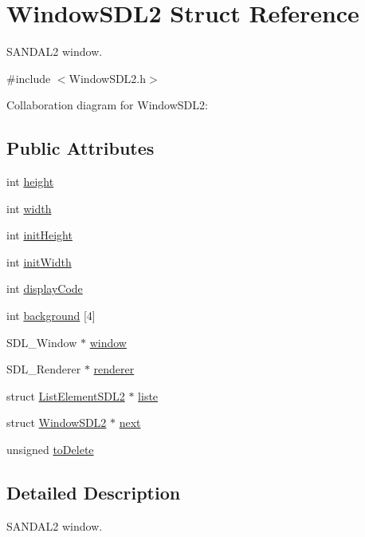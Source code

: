 \hypertarget{structWindowSDL2}{}\section{Window\+S\+D\+L2 Struct Reference}
\label{structWindowSDL2}


S\+A\+N\+D\+A\+L2 window.  




{\ttfamily \#include $<$Window\+S\+D\+L2.\+h$>$}



Collaboration diagram for Window\+S\+D\+L2\+:
\subsection*{Public Attributes}
\begin{DoxyCompactItemize}
\item 
int \hyperlink{structWindowSDL2_a6a3ca624143f2bf9852cb623d302c56d}{height}
\item 
int \hyperlink{structWindowSDL2_ade5a776a9e5a2812542ee9b539d66960}{width}
\item 
int \hyperlink{structWindowSDL2_ad18f000e45db56098bd8c2ea87e75019}{init\+Height}
\item 
int \hyperlink{structWindowSDL2_ab6f213858040a055c371f947c4a71fca}{init\+Width}
\item 
int \hyperlink{structWindowSDL2_ad228c3ac40ae482b85280e3c7d9c3375}{display\+Code}
\item 
int \hyperlink{structWindowSDL2_a1d9cde91afa4d6b0034ba8e15d36bcbe}{background} \mbox{[}4\mbox{]}
\item 
S\+D\+L\+\_\+\+Window $\ast$ \hyperlink{structWindowSDL2_ad40f7b0cfcf7dd62f3f10dc47c04a6b3}{window}
\item 
S\+D\+L\+\_\+\+Renderer $\ast$ \hyperlink{structWindowSDL2_ae0ce53a825d290b40b3bd8db8c433db3}{renderer}
\item 
struct \hyperlink{structListElementSDL2}{List\+Element\+S\+D\+L2} $\ast$ \hyperlink{structWindowSDL2_a0d2c95e19f6936b1487d21317fda92ed}{liste}
\item 
struct \hyperlink{structWindowSDL2}{Window\+S\+D\+L2} $\ast$ \hyperlink{structWindowSDL2_a9f377dedae284ebaedb2d4c4702737ea}{next}
\item 
unsigned \hyperlink{structWindowSDL2_a83f3e9f38d1171818525f22fc7b32080}{to\+Delete}
\end{DoxyCompactItemize}


\subsection{Detailed Description}
S\+A\+N\+D\+A\+L2 window. 

